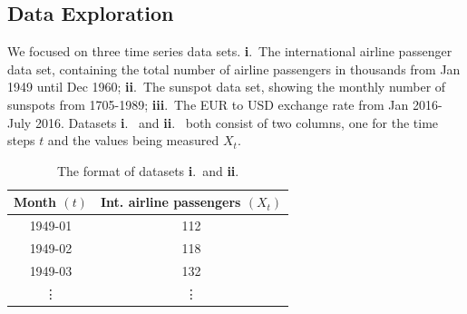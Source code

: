 \documentclass[10pt,a4paper]{article}
\begin{document}
\subsection{Data Exploration}
%
We focused on three time series data sets. {\bf i}.~The international airline passenger data set, containing the total number of airline passengers in thousands from Jan 1949 until Dec 1960; {\bf ii}.~The sunspot data set, showing the monthly number of sunspots from 1705-1989; {\bf iii}.~The EUR to USD exchange rate from Jan 2016- July 2016. Datasets {\bf i}.~ and {\bf ii}.~ both consist of two columns, one for the time steps $t$ and the values being measured $X_t$. 

\begin{table}[h]
\centering
\begin{tabular}{ c c }
Month $(t)$ & Int. airline passengers $(X_t)$ \\ \hline
 1949-01 & 112 \\ 
 1949-02 & 118  \\  
 1949-03 & 132   \\
 \vdots & \vdots 
\end{tabular}
\caption{The format of datasets {\bf i}.~and {\bf ii}.}
\label{table: sample format of dataset i and ii}
\end{table}
\end{document}
